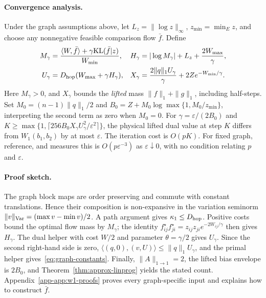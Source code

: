 \paragraph{Convergence analysis.}\label{sec:conv-analysis-flow}
\begin{theorem}\label{thm:graphw1-complexity}
Under the graph assumptions above, let $L_z=\|\log z\|_\infty$, $z_{\min}=\min_Ez$, and choose any nonnegative feasible comparison flow $\bar f$. Define
\begin{align}\label{eq:graph-constants}
 M_\gamma&=\frac{\langle W,\bar f\rangle+\gamma\mathrm{KL}(\bar f|z)}{W_{\min}},&
 H_\gamma&=|\log M_\gamma|+L_z+\frac{2W_{\max}}\gamma,\notag\\
 U_\gamma&=D_{\mathrm{hop}}(W_{\max}+\gamma H_\gamma),&
 X_\gamma&=\frac{2\|q\|_1U_\gamma}{\gamma}+2Ze^{-W_{\min}/\gamma}.
\end{align}
Here $M_\gamma>0$, and $X_\gamma$ bounds the \emph{lifted} mass $\|f\|_1+\|g\|_1$, including half-steps. Set $M_0=(n-1)\|q\|_1/2$ and $B_0=Z+M_0\log\max\{1,M_0/z_{\min}\}$, interpreting the second term as zero when $M_0=0$. For $\gamma=\varepsilon/(2B_0)$ and
$K\geq\max\{1,\lceil256 B_0X_\gamma U_\gamma^2/\varepsilon^2\rceil\}$,
the physical lifted dual value at step $K$ differs from $W_1(b_1,b_2)$ by at most $\varepsilon$. The iteration cost is $O(pK)$. For fixed graph, reference, and measures this is $O(p\varepsilon^{-3})$ as $\varepsilon\downarrow0$, with no condition relating $p$ and $\varepsilon$.
\end{theorem}
\paragraph{Proof sketch.}
The graph block maps are order preserving and commute with constant translations. Hence their composition is non-expansive in the variation seminorm $\|v\|_{\rm Var}=(\max v-\min v)/2$. A path argument gives $\kappa_1\leq D_{\mathrm{hop}}$. Positive costs bound the optimal flow mass by $M_\gamma$; the identity $f^\star_{ij}f^\star_{ji}=z_{ij}z_{ji}e^{-2W_{ij}/\gamma}$ then gives $H_\gamma$. The dual helper with cost $W/2$ and parameter $\theta=\gamma/2$ gives $U_\gamma$. Since the second right-hand side is zero, $\langle(q,0),(v,U)\rangle\leq\|q\|_1U_\gamma$, and the primal helper gives~\eqref{eq:graph-constants}. Finally, $\|A\|_{1\to1}=2$, the lifted bias envelope is $2B_0$, and Theorem~\ref{thm:approx-linprog} yields the stated count. Appendix~\ref{app-app:w1-proofs} proves every graph-specific input and explains how to construct $\bar f$.

